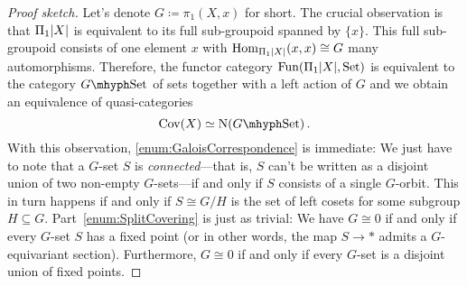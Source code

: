 \begin{proof}[Proof sketch]
	Let's denote $G\coloneqq \pi_1(X,x)$ for short. The crucial observation is that $\Pi_1\abs*{X}$ is equivalent to its full sub-groupoid spanned by $\{x\}$. This full sub-groupoid consists of one element $x$ with $\Hom_{\Pi_1\abs*{X}}(x,x)\cong G$ many automorphisms. Therefore, the functor category $\Fun(\Pi_1\abs*{X},\cat{Set})$ is equivalent to the category $G\mhyph\cat{Set}$ of sets together with a left action of $G$ and we obtain an equivalence of quasi-categories
	\begin{equation*}
		\cat{Cov}(X)\simeq \N\left(G\mhyph\cat{Set}\right)\,.
	\end{equation*}
	With this observation, \cref{enum:GaloisCorrespondence} is immediate: We just have to note that a $G$-set $S$ is \emph{connected}---that is, $S$ can't be written as a disjoint union of two non-empty $G$-sets---if and only if $S$ consists of a single $G$-orbit. This in turn happens if and only if $S\cong G/H$ is the set of left cosets for some subgroup $H\subseteq G$. Part~\cref{enum:SplitCovering} is just as trivial: We have $G\cong 0$ if and only if every $G$-set $S$ has a fixed point (or in other words, the map $S\rightarrow *$ admits a $G$-equivariant section). Furthermore, $G\cong 0$ if and only if every $G$-set is a disjoint union of fixed points.
	

\end{proof}

